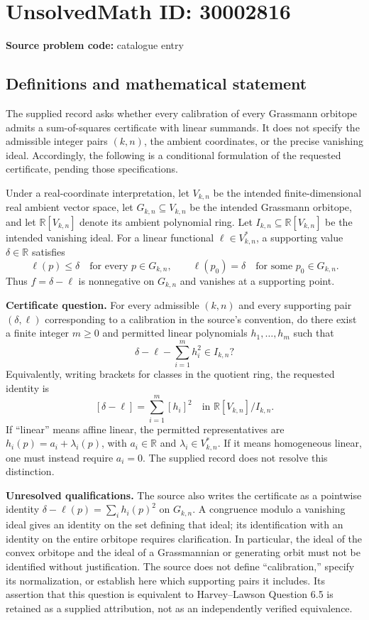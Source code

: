 \documentclass[11pt]{article}
\newcommand{\R}{\mathbb{R}}
\begin{document}
\section*{UnsolvedMath ID: 30002816}
\textbf{Source problem code:} catalogue entry
\subsection{Definitions and mathematical statement}
The supplied record asks whether every calibration of every Grassmann orbitope admits a sum-of-squares certificate with linear summands. It does not specify the admissible integer pairs \((k,n)\), the ambient coordinates, or the precise vanishing ideal. Accordingly, the following is a conditional formulation of the requested certificate, pending those specifications.

Under a real-coordinate interpretation, let \(V_{k,n}\) be the intended finite-dimensional real ambient vector space, let \(G_{k,n}\subseteq V_{k,n}\) be the intended Grassmann orbitope, and let \(\R[V_{k,n}]\) denote its ambient polynomial ring. Let \(I_{k,n}\subseteq\R[V_{k,n}]\) be the intended vanishing ideal. For a linear functional \(\ell\in V_{k,n}^{*}\), a supporting value \(\delta\in\R\) satisfies
\[
\ell(p)\leq\delta\quad\text{for every }p\in G_{k,n},
\qquad
\ell(p_0)=\delta\quad\text{for some }p_0\in G_{k,n}.
\]
Thus \(f=\delta-\ell\) is nonnegative on \(G_{k,n}\) and vanishes at a supporting point.

\textbf{Certificate question.} For every admissible \((k,n)\) and every supporting pair \((\delta,\ell)\) corresponding to a calibration in the source's convention, do there exist a finite integer \(m\geq0\) and permitted linear polynomials \(h_1,\ldots,h_m\) such that
\[
\delta-\ell-\sum_{i=1}^{m}h_i^2\in I_{k,n}?
\]
Equivalently, writing brackets for classes in the quotient ring, the requested identity is
\[
[\delta-\ell]=\sum_{i=1}^{m}[h_i]^2
\quad\text{in }\R[V_{k,n}]/I_{k,n}.
\]
If ``linear'' means affine linear, the permitted representatives are \(h_i(p)=a_i+\lambda_i(p)\), with \(a_i\in\R\) and \(\lambda_i\in V_{k,n}^{*}\). If it means homogeneous linear, one must instead require \(a_i=0\). The supplied record does not resolve this distinction.

\textbf{Unresolved qualifications.} The source also writes the certificate as a pointwise identity \(\delta-\ell(p)=\sum_i h_i(p)^2\) on \(G_{k,n}\). A congruence modulo a vanishing ideal gives an identity on the set defining that ideal; its identification with an identity on the entire orbitope requires clarification. In particular, the ideal of the convex orbitope and the ideal of a Grassmannian or generating orbit must not be identified without justification. The source does not define ``calibration,'' specify its normalization, or establish here which supporting pairs it includes. Its assertion that this question is equivalent to Harvey--Lawson Question 6.5 is retained as a supplied attribution, not as an independently verified equivalence.
\end{document}
